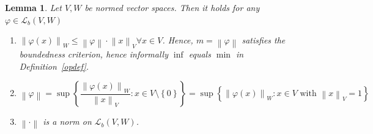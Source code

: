 \documentclass{article}
\newtheorem{lemma}{Lemma}  \numberwithin{lemma}{section}
\newcommand{\set}[1]{\left\{#1\right\}}
\newcommand{\norm}[1]{\left\|#1\right\|}
\begin{document}
\begin{lemma} %
  Let $V, W$ be normed vector spaces. Then it holds for any $\varphi \in \mathcal L_b(V, W)$
  \begin{enumerate}
    \item $\norm{\varphi(x)}_W \leq \norm{\varphi} \cdot \norm{x}_V \forall x \in V$.
      Hence, $m = \norm{\varphi}$ satisfies the boundedness criterion, hence
      informally $\inf$ equals $\min$ in Definition~\ref{opdef}.
    \item
      \[ \norm{\varphi} = \sup\set{\frac{\norm{\varphi(x)}_W}{\norm{x}_V}: x \in V \setminus \set{0}} = \sup\set{\norm{\varphi(x)}_W: x \in V \text{ with } \norm{x}_V = 1} \]
    \item $\norm{\cdot}$ is a norm on $\mathcal L_b(V,W)$.
  \end{enumerate}
\end{lemma}
\end{document}
